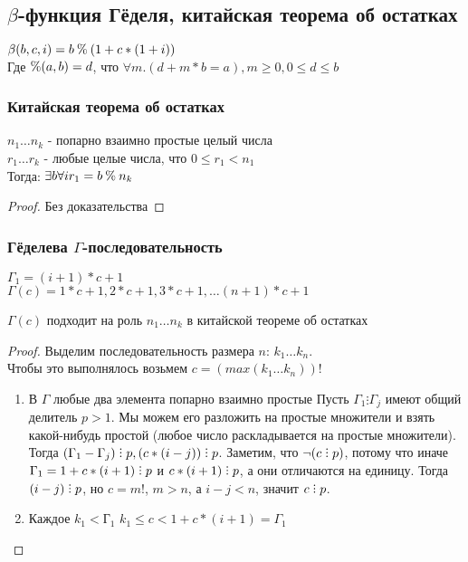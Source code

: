 \subsection{\texorpdfstring{$\beta$}{Бета}-функция Гёделя, китайская теорема об остатках}
\label{sec-11-3}
$\beta(b, c, i) = b \mathbin{\%} (1 + c * (1 + i))$\\
Где $\mathbin{\%}(a, b) = d$, что $\forall m . (d + m * b = a), m \geq 0, 0 \leq d \leq b$

\subsubsection{Китайская теорема об остатках}
\label{sec-11-3-1}
\begin{theorem}
$n_1\dots n_k$ - попарно взаимно простые целый числа\\
$r_1\dots r_k$ - любые целые числа, что $0 \leq r_1 < n_1$\\
Тогда: $\exists b \forall i  r_1 = b \mathbin{\%} n_k$
\end{theorem}
\begin{proof}
Без доказательства
\end{proof}

\subsubsection{Гёделева \texorpdfstring{$\Gamma$}{Г}-последовательность}
\label{sec-11-3-2}
$\Gamma_1 = (i + 1) * c + 1$\\
$\Gamma(c) = 1 * c + 1, 2 * c + 1, 3 * c + 1, \ldots (n + 1) * c + 1$
\begin{theorem}
$\Gamma(c)$ подходит на роль $n_1 \ldots n_k$ в китайской теореме об остатках
\end{theorem}
\begin{proof}
Выделим последовательность размера $n$: $k_1 \ldots k_n$.\\
Чтобы это выполнялось возьмем $c = (max(k_1\dots k_n))!$
\begin{enumerate}
\item В $\Gamma$ любые два элемента попарно взаимно простые
\label{sec-11-3-2-1}
Пусть $\Gamma_1 \vdots \Gamma_j$ имеют общий делитель $p > 1$. Мы можем его разложить на простые множители и взять какой-нибудь простой (любое число раскладывается на простые множители).\\
Тогда $(\Gamma_1 - \Gamma_j) \divby p, (c * (i - j)) \divby p$. Заметим, что $\lnot (c \divby p)$, потому что иначе $\Gamma_1 = 1 + c * (i + 1) \divby p$ и $c * (i + 1) \divby p$, а они отличаются на единицу. Тогда $(i - j) \divby p$, но $c = m!$, $m > n$, а $i - j < n$, значит $c \divby p$.
\item Каждое $k_1 < Г_1$
\label{sec-11-3-2-2}
$k_1 \leq c < 1 + c * (i + 1) = \Gamma_1$
\end{enumerate}
\end{proof}
